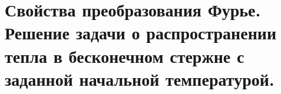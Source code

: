 \chapter{Свойства преобразования Фурье. Решение задачи о распространении тепла
в бесконечном стержне с заданной начальной температурой.}

\newpage
